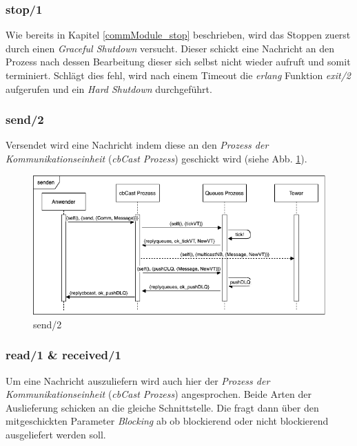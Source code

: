 \subsubsection{stop/1} \label{cbcast_stop_realisierung}

Wie bereits in Kapitel \ref{commModule_stop} beschrieben, wird das Stoppen zuerst durch einen \textit{Graceful Shutdown} versucht. Dieser schickt eine Nachricht an den Prozess nach dessen Bearbeitung dieser sich selbst nicht wieder aufruft und somit terminiert. Schlägt dies fehl, wird nach einem Timeout die \textit{erlang} Funktion \textit{exit/2} aufgerufen und ein \textit{Hard Shutdown} durchgeführt.

\subsubsection{send/2}

Versendet wird eine Nachricht indem diese an den \textit{Prozess der Kommunikationseinheit} (\textit{cbCast Prozess}) geschickt wird (siehe Abb. \ref{fig:sequence_send_realisierung}).

\begin{figure}[htbp]
\begin{center}
\includegraphics[scale=0.6]{Latex/Bilder/send_realisierung.png}
\caption{\label{fig:sequence_send_realisierung} send/2}
\end{center}
\end{figure}

\subsubsection{read/1 \& received/1}

Um eine Nachricht auszuliefern wird auch hier der \textit{Prozess der Kommunikationseinheit} (\textit{cbCast Prozess}) angesprochen. Beide Arten der Auslieferung schicken an die gleiche Schnittstelle. Die fragt dann über den mitgeschickten Parameter \textit{Blocking} ab ob blockierend oder nicht blockierend ausgeliefert werden soll.

